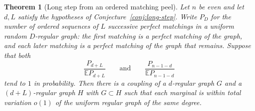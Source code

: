 \documentclass[11pt]{article}
\newtheorem{theorem}{Theorem}
\newcommand{\EE}{\mathbb{E}}
\begin{document}
\begin{theorem}[Long step from an ordered matching peel]
\label{thm:long-from-peel}
Let \(n\) be even and let \(d,L\) satisfy the hypotheses of
Conjecture~\ref{conj:long-step}.
Write \(P_D\) for the number of ordered sequences of \(L\) successive perfect
matchings in a uniform random \(D\)-regular graph: the first matching is a
perfect matching of the graph, and each later matching is a perfect matching
of the graph that remains.
Suppose that both
\[
\frac{P_{d+L}}{\EE P_{d+L}}
\qquad\text{and}\qquad
\frac{P_{n-1-d}}{\EE P_{n-1-d}}
\]
tend to \(1\) in probability.
Then there is a coupling of a \(d\)-regular graph \(G\) and a
\((d+L)\)-regular graph \(H\) with \(G\subset H\) such that each marginal is
within total variation \(o(1)\) of the uniform regular graph of the same degree.
\end{theorem}
\end{document}
